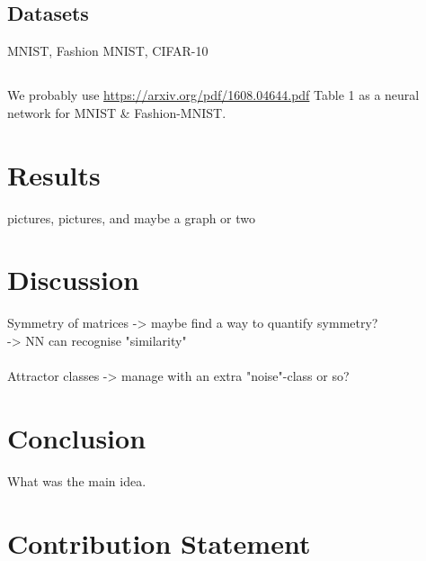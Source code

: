 \documentclass{article}
\begin{document}
\subsection{Datasets}
MNIST, Fashion MNIST, CIFAR-10

\subsection{}
We probably use \url{https://arxiv.org/pdf/1608.04644.pdf} Table 1 as a neural network for MNIST \& Fashion-MNIST.

\section{Results}
pictures, pictures, and maybe a graph or two

\section{Discussion}

Symmetry of matrices -> maybe find a way to quantify symmetry?\\
-> NN can recognise "similarity"\\
\\

Attractor classes -> manage with an extra "noise"-class or so?\\

\section{Conclusion}
What was the main idea.

\section{Contribution Statement}



\end{document}
